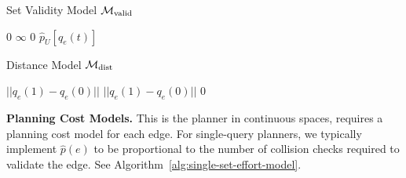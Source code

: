 \begin{genericfloat}
   {%
   \algrenewcommand\textproc{}%
   \begin{minipage}[t]{0.49\linewidth}%
      \vspace{-0.17in}%
      \begin{algorithm}[H]
         \caption{Set Validity Model
            $\mathcal{M}_{\mbox{\scriptsize valid}}$}
         \label{alg:single-set-effort-model}
         \begin{algorithmic}[1]
               \State \Return $0$
            \Else
               \State \Return $\infty$
            \EndIf
         \EndFunction
            \State \Return $0$
         \EndFunction
            \State \Return $\hat{p}_U[q_e(t)]$
         \EndFunction
         \end{algorithmic}
      \end{algorithm}
   \end{minipage}%
   \hspace{0.02\linewidth}%
   \begin{minipage}[t]{0.49\linewidth}%
      \vspace{-0.17in}%
      \begin{algorithm}[H]
         \caption{Distance Model
            $\mathcal{M}_{\mbox{\scriptsize dist}}$}
         \begin{algorithmic}[1]
            \State \Return $|| q_e(1) - q_e(0) ||$
         \EndFunction
            \State \Return $|| q_e(1) - q_e(0) ||$
         \EndFunction
            \State \Return $0$
         \EndFunction
         \end{algorithmic}
      \end{algorithm}
   \end{minipage}%
   }%
\end{genericfloat}

\textbf{Planning Cost Models.}
This is the planner in continuous spaces,
requires a planning cost model for each edge.
For single-query planners,
we typically implement $\hat{p}(e)$ to be
proportional to the number of collision checks required
to validate the edge.
See Algorithm~\ref{alg:single-set-effort-model}.

